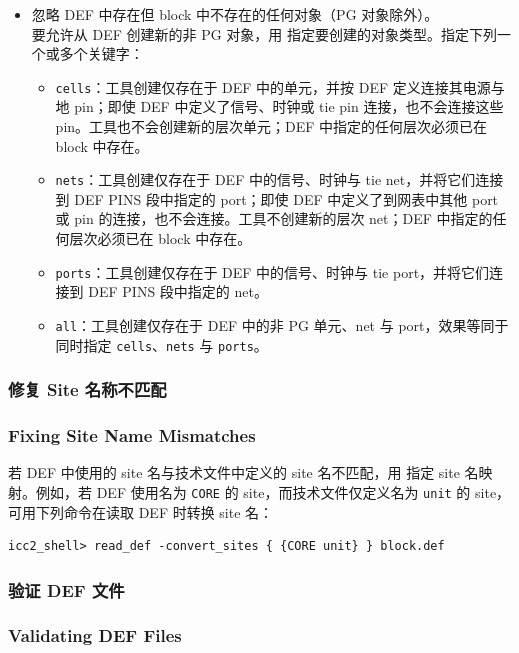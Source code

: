 \begin{itemize}
  \item 忽略 DEF 中存在但 block 中不存在的任何对象（PG 对象除外）。\\
    要允许从 DEF 创建新的非 PG 对象，用  指定要创建的对象类型。指定下列一个或多个关键字：
    \begin{itemize}
      \item \texttt{cells}：工具创建仅存在于 DEF 中的单元，并按 DEF 定义连接其电源与地 pin；即使 DEF 中定义了信号、时钟或 tie pin 连接，也不会连接这些 pin。工具也不会创建新的层次单元；DEF 中指定的任何层次必须已在 block 中存在。
      \item \texttt{nets}：工具创建仅存在于 DEF 中的信号、时钟与 tie net，并将它们连接到 DEF PINS 段中指定的 port；即使 DEF 中定义了到网表中其他 port 或 pin 的连接，也不会连接。工具不创建新的层次 net；DEF 中指定的任何层次必须已在 block 中存在。
      \item \texttt{ports}：工具创建仅存在于 DEF 中的信号、时钟与 tie port，并将它们连接到 DEF PINS 段中指定的 net。
      \item \texttt{all}：工具创建仅存在于 DEF 中的非 PG 单元、net 与 port，效果等同于同时指定 \texttt{cells}、\texttt{nets} 与 \texttt{ports}。
    \end{itemize}
\end{itemize}

\subsubsection{修复 Site 名称不匹配}
\subsubsection*{Fixing Site Name Mismatches}

若 DEF 中使用的 site 名与技术文件中定义的 site 名不匹配，用  指定 site 名映射。例如，若 DEF 使用名为 \texttt{CORE} 的 site，而技术文件仅定义名为 \texttt{unit} 的 site，可用下列命令在读取 DEF 时转换 site 名：
\begin{lstlisting}
icc2_shell> read_def -convert_sites { {CORE unit} } block.def
\end{lstlisting}

\subsubsection{验证 DEF 文件}
\subsubsection*{Validating DEF Files}

